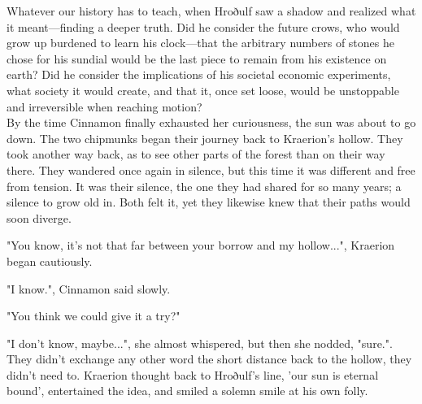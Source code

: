 Whatever our history has to teach, when Hroðulf saw a shadow and realized what it meant---finding a deeper truth. Did he consider the future crows, who would grow up burdened to learn his clock---that the arbitrary numbers of stones he chose for his sundial would be the last piece to remain from his existence on earth?
Did he consider the implications of his societal economic experiments, what society it would create, and that it, once set loose, would be unstoppable and irreversible when reaching motion?\\

By the time Cinnamon finally exhausted her curiousness, the sun was about to go down. The two chipmunks began their journey back to Kraerion's hollow. They took another way back, as to see other parts of the forest than on their way there. They wandered once again in silence, but this time it was different and free from tension. It was their silence, the one they had shared for so many years; a silence to grow old in. Both felt it, yet they likewise knew that their paths would soon diverge.

"You know, it's not that far between your borrow and my hollow...", Kraerion began cautiously.

"I know.", Cinnamon said slowly.

"You think we could give it a try?"

"I don't know, maybe...", she almost whispered, but then she nodded, "sure.". They didn't exchange any other word the short distance back to the hollow, they didn't need to. Kraerion thought back to Hroðulf's line, 'our sun is eternal bound', entertained the idea, and smiled a solemn smile at his own folly.
